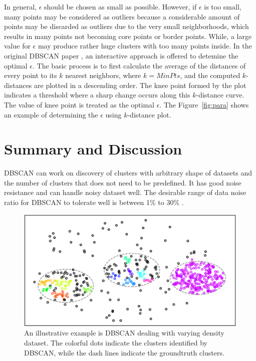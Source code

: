 In general, $\epsilon$ should be chosen as small as possible. However, if 
$\epsilon$ is too small, many points may be considered as outliers because a considerable amount of points may be discarded as outliers due to the very small neighborhoods, which results in many points not becoming core points or border points. While, a large value for $\epsilon$ may produce rather huge clusters with too many points inside.
In the original DBSCAN paper 
\cite{ester1996density}, an interactive approach is offered to detemine the 
optimal 
$\epsilon$.  The basic process is to first calculate the average of the 
distances of every point to its $k$ nearest neighbors, where $k = MinPts$, and 
the computed $k$-distances are plotted in a descending order. The knee point 
formed by the plot indicates a threshold where a sharp change occurs along this 
$k$-distance curve. The value of knee point is treated as the optimal 
$\epsilon$. The Figure~\ref{fig:para} shows an example of determining the 
$\epsilon$ using $k$-distance plot. 



\section{Summary and Discussion}

DBSCAN can work on discovery of clusters with arbitrary shape of datasets and 
the number of clusters that does not need to be predefined. It has good noise 
resistance and can handle noisy dataset well. The desirable range of data noise 
ratio for DBSCAN to tolerate well is between 1\% to 30\%
\cite{schubert2017dbscan}. 


\begin{figure}
	\centering
	\includegraphics[width=\textwidth]{"Part 3 - Learning Systems/Unsupervised Learning/DBScan/figures/var-density.png"}
	\caption{An illustrative example is DBSCAN dealing with varying density 
	dataset. The colorful dots indicate the clusters identified by DBSCAN, 
	while the dash lines indicate the groundtruth clusters.}
      \label{fig:varying}
\end{figure}

